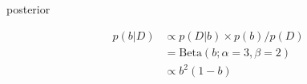\documentclass[t, aspectratio=169]{beamer}
\begin{document}
\begin{frame}
  \begin{minipage}{0.1\paperwidth}
    posterior
  \end{minipage}
  \begin{minipage}{0.3\paperwidth}
    \begin{align*}
      p(b|D) &\propto p(D|b)\times p(b) / p(D)\\
             &=\mathrm{Beta}(b; \alpha=3, \beta=2) \\
             &\propto b^2(1-b)
    \end{align*}
  \end{minipage}
  \begin{minipage}[t]{0.3\paperwidth}
  \begin{adjustbox}{width=0.7\textwidth}
    \end{adjustbox}
  \end{minipage}
\end{frame}
\end{document}
